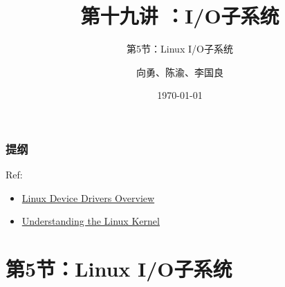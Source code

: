 


\title[第19讲]{第十九讲 ：I/O子系统} %
\subtitle{第5节：Linux I/O子系统}
\author{向勇、陈渝、李国良} %
\date{\today} %



\begin{frame}
\titlepage %
\end{frame}

\begin{frame}
\frametitle{提纲} %
\tableofcontents %

Ref:
    \begin{itemize}
        \item \href{http://osq.cs.berkeley.edu/public/JFoster-Drivers.ppt}{Linux Device Drivers Overview}
        \item \href{http://ermak.cs.nstu.ru/understanding.linux.kernel.pdf}{Understanding the Linux Kernel}
    \end{itemize}

\end{frame}
\section{第5节：Linux I/O子系统} %
